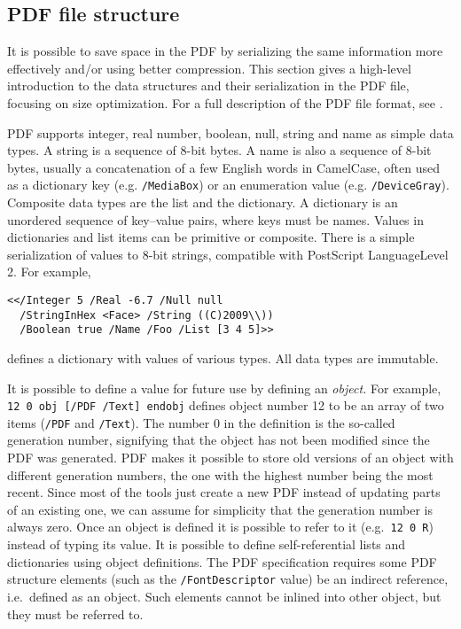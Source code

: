 \documentclass{ltugproc}
\begin{document}
\subsection{PDF file structure}

It is possible to save space in the PDF by serializing the same information
more effectively and/or using better compression. This section gives a
high-level introduction to the data structures and their serialization in
the PDF file, focusing on size optimization. For a full description of the
PDF file format, see \cite{pdfref}.

PDF supports integer, real number, boolean, null, string and name as
simple data types. A string is a sequence of 8-bit bytes. A name is also a
sequence of 8-bit bytes, usually a concatenation of a few English words in
CamelCase, often used as a dictionary key (e.g. \texttt{/MediaBox}) or an
enumeration value (e.g. \texttt{/DeviceGray}). Composite data types are the
list and the dictionary. A dictionary is an unordered sequence of key--value
pairs, where keys must be names. Values in dictionaries and list items can
be primitive or composite. There is a simple serialization of values to
8-bit strings, compatible with PostScript LanguageLevel\,2. For example,
%
\begin{verbatim}
<</Integer 5 /Real -6.7 /Null null
  /StringInHex <Face> /String ((C)2009\\))
  /Boolean true /Name /Foo /List [3 4 5]>>
\end{verbatim}
\noindent defines a dictionary
with values of various types. All data types are immutable.

It is possible to define a value for future use by defining an
\emph{object.} For example, \texttt{12 0 obj [/PDF /Text] endobj} defines
object number 12 to be an array of two items (\texttt{/PDF} and
\texttt{/Text}). The number 0 in the definition is the so-called generation
number, signifying that the object has not been modified since the PDF was
generated. PDF makes it possible to store old versions of an object with
different generation numbers, the one with the highest number being the most
recent. Since most of the tools just create a new PDF instead
of updating parts of an existing one, we can assume for simplicity that the
generation number is always zero. Once an object is defined it is possible
to refer to it (e.g.\ \texttt{12 0 R}) instead of typing its value. It is
possible to define self-referential lists and dictionaries using object
definitions. The PDF specification requires some PDF structure elements
(such as the \texttt{/FontDescriptor} value) be an indirect reference,
i.e.\ defined as an object. Such elements cannot be inlined into other
object, but they must be referred to.
\end{document}
